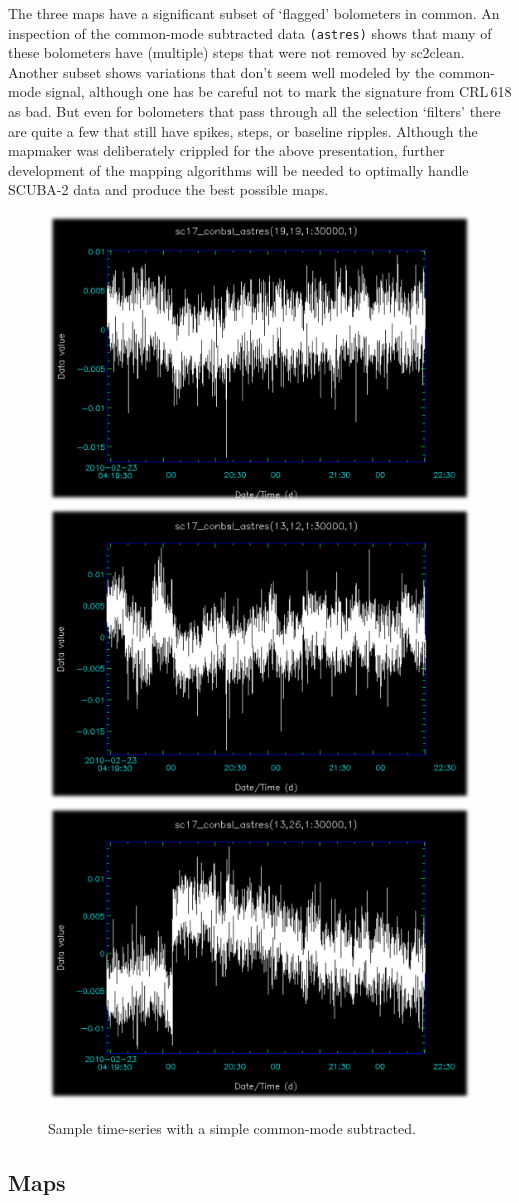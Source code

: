 \documentclass[twoside,11pt]{article}
\newcommand{\xref}[3]{#1}
\newcommand{\xlabel}[1]{}
\renewcommand{\_}{\texttt{\symbol{95}}}
\newcommand{\task}[1]{\textsf{#1}}
\newcommand{\clean}{\xref{\task{sc2clean}}{sun258}{SC2CLEAN}}
\begin{document}
The three maps have a significant subset of `flagged' bolometers in
common.  An inspection of the common-mode subtracted data \texttt{(\_astres)}
shows that many of these bolometers have (multiple) steps that were
not removed by \clean.  Another subset shows variations that don't
seem well modeled by the common-mode signal, although one has be
careful not to mark the signature from CRL\,618 as bad. But even for
bolometers that pass through all the selection `filters' there are
quite a few that still have spikes, steps, or baseline ripples.
Although the mapmaker was deliberately crippled for the above
presentation, further development of the mapping algorithms will be
needed to optimally handle SCUBA-2 data and produce the best possible
maps.

\begin{figure}[ht]
\begin{center}
\includegraphics[width=0.30\linewidth]{sc19_conbsl_astres_19_19}
\hspace{0.03\linewidth}
\includegraphics[width=0.30\linewidth]{sc19_conbsl_astres_13_12}
\hspace{0.03\linewidth}
\includegraphics[width=0.30\linewidth]{sc19_conbsl_astres_13_26}
\caption{Sample time-series with a simple common-mode subtracted.}
\label{fig:sampleastres}
\end{center}
\end{figure}
\subsection{\xlabel{samplemaps}Maps}
\label{sec:samplemaps}
\end{document}
